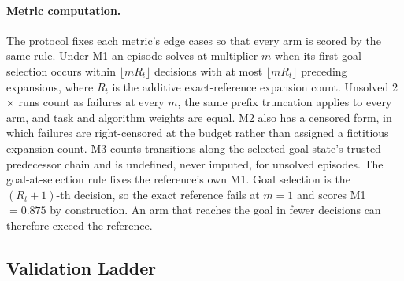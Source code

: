 \paragraph{Metric computation.}
The protocol fixes each metric's edge cases so that every arm is scored by the same rule. Under M1 an episode solves at multiplier $m$ when its first goal selection occurs within $\lfloor m R_t \rfloor$ decisions with at most $\lfloor m R_t \rfloor$ preceding expansions, where $R_t$ is the additive exact-reference expansion count. Unsolved 2$\times$ runs count as failures at every $m$, the same prefix truncation applies to every arm, and task and algorithm weights are equal. M2 also has a censored form, in which failures are right-censored at the budget rather than assigned a fictitious expansion count. M3 counts transitions along the selected goal state's trusted predecessor chain and is undefined, never imputed, for unsolved episodes.
The goal-at-selection rule fixes the reference's own M1. Goal selection is the $(R_t{+}1)$-th decision, so the exact reference fails at $m = 1$ and scores M1 $= 0.875$ by construction. An arm that reaches the goal in fewer decisions can therefore exceed the reference.




\subsection{Validation Ladder}
\label{app:results-ladder}
\label{sec:results-ladder}

